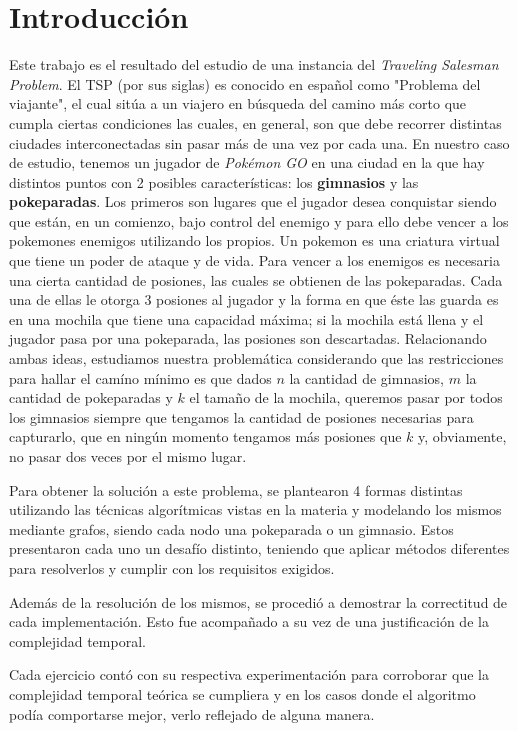 \section{Introducción}

Este trabajo es el resultado del estudio de una instancia del \textit{Traveling Salesman Problem}. El TSP (por sus siglas) es conocido en español como "Problema del viajante", el cual sitúa a un viajero en búsqueda del camino más corto que cumpla ciertas condiciones las cuales, en general, son que debe recorrer distintas ciudades interconectadas sin pasar más de una vez por cada una. En nuestro caso de estudio, tenemos un jugador de \textit{Pokémon GO} en una ciudad en la que hay distintos puntos con 2 posibles características: los \textbf{gimnasios} y las \textbf{pokeparadas}. Los primeros son lugares que el jugador desea conquistar siendo que están, en un comienzo, bajo control del enemigo y para ello debe vencer a los pokemones enemigos utilizando los propios. Un pokemon es una criatura virtual que tiene un poder de ataque y de vida. Para vencer a los enemigos es necesaria una cierta cantidad de posiones, las cuales se obtienen de las pokeparadas. Cada una de ellas le otorga 3 posiones al jugador y la forma en que éste las guarda es en una mochila que tiene una capacidad máxima; si la mochila está llena y el jugador pasa por una pokeparada, las posiones son descartadas. Relacionando ambas ideas, estudiamos nuestra problemática considerando que las restricciones para hallar el camíno mínimo es que dados $n$ la cantidad de gimnasios, $m$ la cantidad de pokeparadas y $k$ el tamaño de la mochila, queremos pasar por todos los gimnasios siempre que tengamos la cantidad de posiones necesarias para capturarlo, que en ningún momento tengamos más posiones que $k$ y, obviamente, no pasar dos veces por el mismo lugar.

Para obtener la solución a este problema, se plantearon 4 formas distintas utilizando las técnicas algorítmicas vistas en la materia y modelando los mismos mediante grafos, siendo cada nodo una pokeparada o un gimnasio. Estos presentaron cada uno un desafío distinto, teniendo que aplicar métodos diferentes para resolverlos y cumplir con los requisitos exigidos.

Además de la resolución de los mismos, se procedió a demostrar la correctitud de
cada implementación. Esto fue acompañado a su vez de una justificación de la
complejidad temporal.

Cada ejercicio contó con su respectiva experimentación para corroborar que la
complejidad temporal teórica se cumpliera y en los casos donde el algoritmo
podía comportarse mejor, verlo reflejado de alguna manera.

